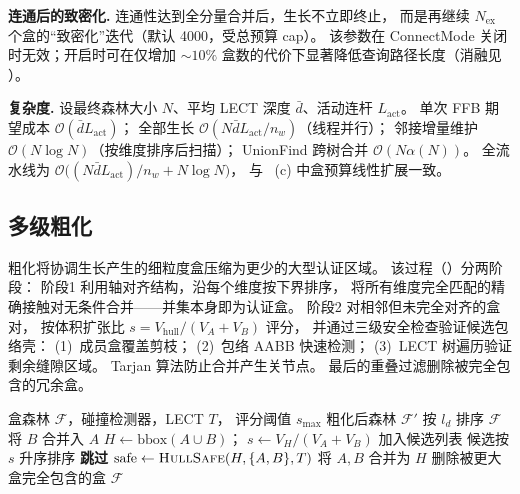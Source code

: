 \documentclass[journal]{IEEEtran}
\begin{document}
\textbf{连通后的致密化.}
连通性达到全分量合并后，生长不立即终止，
而是再继续 $N_\text{ex}$ 个盒的“致密化”迭代（默认 4000，受总预算 cap）。
该参数在 ConnectMode 关闭时无效；开启时可在仅增加 $\sim\!10\%$
盒数的代价下显著降低查询路径长度（消融见 ）。

\textbf{复杂度.}
设最终森林大小 $N$、平均 LECT 深度 $\bar d$、活动连杆 $L_\text{act}$。
单次 FFB 期望成本 $\mathcal{O}(\bar d L_\text{act})$；
全部生长 $\mathcal{O}(N\bar d L_\text{act}/n_w)$（线程并行）；
邻接增量维护 $\mathcal{O}(N\log N)$（按维度排序后扫描）；
UnionFind 跨树合并 $\mathcal{O}(N\alpha(N))$。
全流水线为 $\mathcal{O}\!\bigl((N\bar d L_\text{act})/n_w + N\log N\bigr)$，
与 ~(c) 中盒预算线性扩展一致。

\subsection{多级粗化}

粗化将协调生长产生的细粒度盒压缩为更少的大型认证区域。
该过程（）分两阶段：
阶段1 利用轴对齐结构，沿每个维度按下界排序，
将所有维度完全匹配的精确接触对无条件合并——并集本身即为认证盒。
阶段2 对相邻但未完全对齐的盒对，
按体积扩张比 $s = V_{\text{hull}}/(V_A{+}V_B)$ 评分，
并通过三级安全检查验证候选包络壳：
(1)~成员盒覆盖剪枝；
(2)~包络 AABB 快速检测；
(3)~LECT 树遍历验证剩余缝隙区域。
Tarjan 算法防止合并产生关节点。
最后的重叠过滤删除被完全包含的冗余盒。

\begin{algorithm}[t]
\caption{多级粗化}\label{alg:coarsen}
\footnotesize
\begin{algorithmic}[1]
\REQUIRE 盒森林 $\mathcal{F}$，碰撞检测器，LECT $T$，
  评分阈值 $s_{\max}$
\ENSURE 粗化后森林 $\mathcal{F}'$
\STATE {}
  \STATE 按 $l_d$ 排序 $\mathcal{F}$
    \STATE 将 $B$ 合并入 $A$  \hfill{}
  \ENDFOR
\ENDFOR
\STATE {}
  \STATE $H \leftarrow \mathrm{bbox}(A \cup B)$；
    $s \leftarrow V_H / (V_A + V_B)$
    \STATE 加入候选列表
  \ENDIF
\ENDFOR
\STATE 候选按 $s$ 升序排序
    \STATE \textbf{跳过}  \hfill{}
  \ENDIF
  \STATE $\text{safe} \leftarrow \textsc{HullSafe}(H, \{A,B\}, T)$
    \hfill{}
    \STATE 将 $A, B$ 合并为 $H$
  \ENDIF
\ENDFOR
\STATE 删除被更大盒完全包含的盒
\RETURN $\mathcal{F}$
\end{algorithmic}
\end{algorithm}
\end{document}
